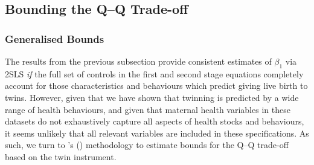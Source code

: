 \documentclass[subeqn]{article}
\begin{document}
\begin{spacing}{1.4}
\subsection{Bounding the Q--Q Trade-off}           \label{TWINsscn:resultBounds}
\subsubsection{Generalised Bounds}
The results from the previous subsection provide consistent estimates of 
$\beta_1$ via 2SLS \emph{if} the full set of controls in the first and second 
stage equations completely account for those characteristics and behaviours 
which predict giving live birth to twins. However, given that we have shown that 
twinning is predicted by a wide range of health behaviours, and given that 
maternal health variables in these datasets do not exhaustively capture all 
aspects of health stocks and behaviours, it seems unlikely that all relevant 
variables are included in these specifications. As such, we turn to 
\citeauthor{Conleyetal2012}'s (\citeyear{Conleyetal2012}) methodology to
estimate bounds for the Q--Q trade-off based on the twin instrument.


\end{spacing}
\end{document}
